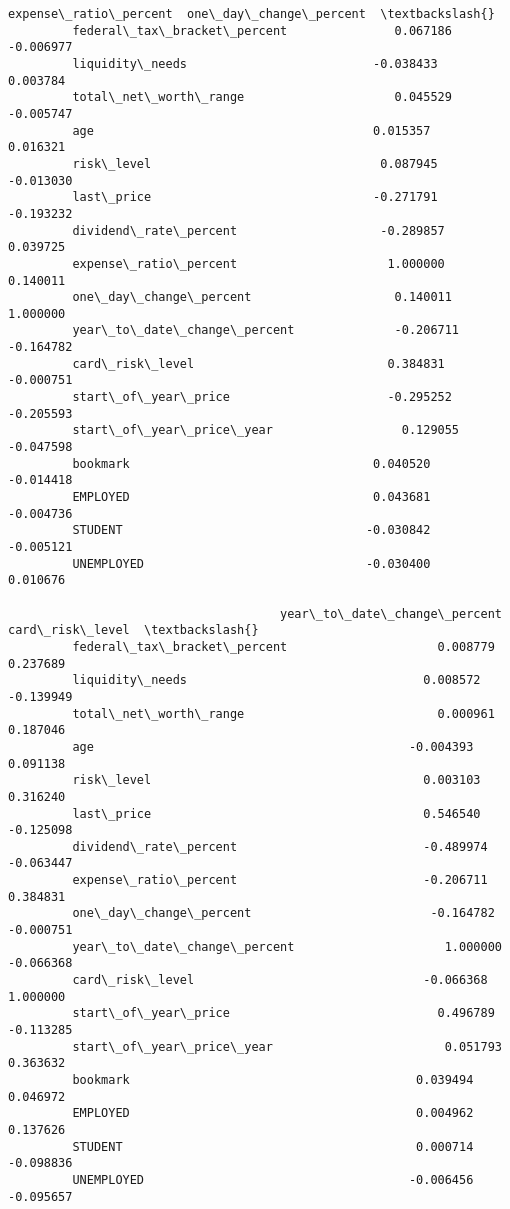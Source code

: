 \documentclass[11pt]{article}
\begin{document}
\begin{Verbatim}[commandchars=\\\{\}]
                                      expense\_ratio\_percent  one\_day\_change\_percent  \textbackslash{}
         federal\_tax\_bracket\_percent               0.067186               -0.006977   
         liquidity\_needs                          -0.038433                0.003784   
         total\_net\_worth\_range                     0.045529               -0.005747   
         age                                       0.015357                0.016321   
         risk\_level                                0.087945               -0.013030   
         last\_price                               -0.271791               -0.193232   
         dividend\_rate\_percent                    -0.289857                0.039725   
         expense\_ratio\_percent                     1.000000                0.140011   
         one\_day\_change\_percent                    0.140011                1.000000   
         year\_to\_date\_change\_percent              -0.206711               -0.164782   
         card\_risk\_level                           0.384831               -0.000751   
         start\_of\_year\_price                      -0.295252               -0.205593   
         start\_of\_year\_price\_year                  0.129055               -0.047598   
         bookmark                                  0.040520               -0.014418   
         EMPLOYED                                  0.043681               -0.004736   
         STUDENT                                  -0.030842               -0.005121   
         UNEMPLOYED                               -0.030400                0.010676   
         
                                      year\_to\_date\_change\_percent  card\_risk\_level  \textbackslash{}
         federal\_tax\_bracket\_percent                     0.008779         0.237689   
         liquidity\_needs                                 0.008572        -0.139949   
         total\_net\_worth\_range                           0.000961         0.187046   
         age                                            -0.004393         0.091138   
         risk\_level                                      0.003103         0.316240   
         last\_price                                      0.546540        -0.125098   
         dividend\_rate\_percent                          -0.489974        -0.063447   
         expense\_ratio\_percent                          -0.206711         0.384831   
         one\_day\_change\_percent                         -0.164782        -0.000751   
         year\_to\_date\_change\_percent                     1.000000        -0.066368   
         card\_risk\_level                                -0.066368         1.000000   
         start\_of\_year\_price                             0.496789        -0.113285   
         start\_of\_year\_price\_year                        0.051793         0.363632   
         bookmark                                        0.039494         0.046972   
         EMPLOYED                                        0.004962         0.137626   
         STUDENT                                         0.000714        -0.098836   
         UNEMPLOYED                                     -0.006456        -0.095657   
         

\end{Verbatim}
\end{document}

